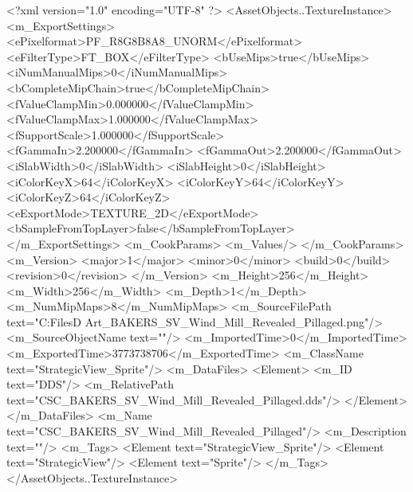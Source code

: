 <?xml version="1.0" encoding="UTF-8" ?>
<AssetObjects..TextureInstance>
	<m_ExportSettings>
		<ePixelformat>PF_R8G8B8A8_UNORM</ePixelformat>
		<eFilterType>FT_BOX</eFilterType>
		<bUseMips>true</bUseMips>
		<iNumManualMips>0</iNumManualMips>
		<bCompleteMipChain>true</bCompleteMipChain>
		<fValueClampMin>0.000000</fValueClampMin>
		<fValueClampMax>1.000000</fValueClampMax>
		<fSupportScale>1.000000</fSupportScale>
		<fGammaIn>2.200000</fGammaIn>
		<fGammaOut>2.200000</fGammaOut>
		<iSlabWidth>0</iSlabWidth>
		<iSlabHeight>0</iSlabHeight>
		<iColorKeyX>64</iColorKeyX>
		<iColorKeyY>64</iColorKeyY>
		<iColorKeyZ>64</iColorKeyZ>
		<eExportMode>TEXTURE_2D</eExportMode>
		<bSampleFromTopLayer>false</bSampleFromTopLayer>
	</m_ExportSettings>
	<m_CookParams>
		<m_Values/>
	</m_CookParams>
	<m_Version>
		<major>1</major>
		<minor>0</minor>
		<build>0</build>
		<revision>0</revision>
	</m_Version>
	<m_Height>256</m_Height>
	<m_Width>256</m_Width>
	<m_Depth>1</m_Depth>
	<m_NumMipMaps>8</m_NumMipMaps>
	<m_SourceFilePath text="C:\Users\Shadow\Desktop\Working Files\2D Art\Quarters\Bakers\StrategicView\CSC_BAKERS_SV_Wind_Mill_Revealed_Pillaged.png"/>
	<m_SourceObjectName text=""/>
	<m_ImportedTime>0</m_ImportedTime>
	<m_ExportedTime>3773738706</m_ExportedTime>
	<m_ClassName text="StrategicView_Sprite"/>
	<m_DataFiles>
		<Element>
			<m_ID text="DDS"/>
			<m_RelativePath text="CSC_BAKERS_SV_Wind_Mill_Revealed_Pillaged.dds"/>
		</Element>
	</m_DataFiles>
	<m_Name text="CSC_BAKERS_SV_Wind_Mill_Revealed_Pillaged"/>
	<m_Description text=""/>
	<m_Tags>
		<Element text="StrategicView_Sprite"/>
		<Element text="StrategicView"/>
		<Element text="Sprite"/>
	</m_Tags>
</AssetObjects..TextureInstance>

